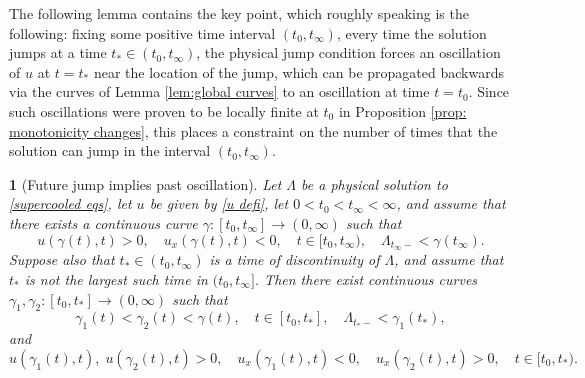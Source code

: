 \documentclass{article}
\numberwithin{equation}{section}
\numberwithin{figure}{section}
\theoremstyle{plain}
\theoremstyle{plain}
\theoremstyle{plain}
\theoremstyle{plain}
\newtheorem{lem}[thm]{\protect\lemmaname}
\theoremstyle{definition}
\theoremstyle{remark}
\providecommand{\lemmaname}{Lemma}
\begin{document}
The following lemma contains the key point, which roughly speaking is the following: fixing some positive time interval $(t_0,t_{\infty})$, every time the solution jumps at a time $t_*\in (t_0,t_{\infty})$, the physical jump condition forces an oscillation of $u$ at $t=t_*$ near the location of the jump, which can be propagated backwards via the curves of Lemma \ref{lem:global curves} to an oscillation at time $t=t_0$. Since such oscillations were proven to be locally finite at $t_0$ in Proposition \ref{prop: monotonicity changes}, this places a constraint on the number of times that the solution can jump in the interval $(t_0,t_{\infty})$.
\begin{lem}[Future jump implies past oscillation] \label{lem: jump implies oscillation}  Let $\Lambda$ be a physical solution to \eqref{supercooled eqs}, let $u$ be given by \eqref{u defi}, let $0<t_0<t_{\infty}<\infty$, and assume that there exists a continuous curve $\gamma: [t_0,t_{\infty}]\to (0,\infty)$ such that 
\begin{equation} \label{gam4210d} u(\gamma(t),t)>0, \quad u_x(\gamma(t),t)<0, \quad t\in [t_0,t_{\infty}), \quad\Lambda_{t_{\infty}-}<\gamma(t_{\infty}).\end{equation}
Suppose also that $t_*\in (t_0,t_{\infty})$ is a time of discontinuity of $\Lambda$, and assume that $t_*$ is not the largest such time in $(t_0,t_{\infty}]$.
 Then there exist continuous curves $\gamma_1,\gamma_2:[t_0,t_*]\to (0,\infty)$ such that
\begin{equation} \label{curvcond1202}\gamma_1(t)<\gamma_2(t)<\gamma(t), \quad t\in [t_0,t_*], \quad \Lambda_{t_*-}<\gamma_1(t_*),\end{equation}
and
\begin{equation} \label{curvcond1203}u(\gamma_1(t),t),\;u(\gamma_2(t),t)>0, \quad u_x(\gamma_1(t),t)<0, \quad u_x(\gamma_2(t),t)>0, \quad t\in [t_0,t_*). \end{equation}
\end{lem}
\end{document}
